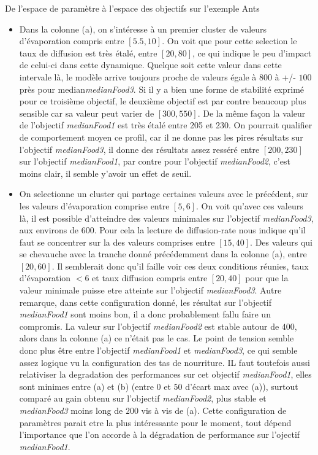 \begin{testiv}{De l'espace de paramètre à l'espace des objectifs sur l'exemple Ants }{}
\begin{itemize}[nolistsep]
	\item Dans la colonne (a), on s'intéresse à un premier cluster de valeurs d'évaporation compris entre $[5.5, 10]$. On voit que pour cette selection le taux de diffusion est très étalé, entre $[20, 80]$, ce qui indique le peu d'impact de celui-ci dans cette dynamique. Quelque soit cette valeur dans cette intervale là, le modèle arrive toujours proche de valeurs égale à $800$ à +/- $100$ près pour median\textit{medianFood3}. Si il y a bien une forme de stabilité exprimé pour ce troisième objectif, le deuxième objectif est par contre beaucoup plus sensible car sa valeur peut varier de $[300, 550]$. De la même façon la valeur de l'objectif \textit{medianFood1} est très étalé entre 205 et 230. On pourrait qualifier de comportement moyen ce profil, car il ne donne pas les pires résultats sur l'objectif \textit{medianFood3}, il donne des résultats assez resséré entre $[200, 230]$ sur l'objectif \textit{medianFood1}, par contre pour l'objectif \textit{medianFood2}, c'est moins clair, il semble y'avoir un effet de seuil.
	\item On selectionne un cluster qui partage certaines valeurs avec le précédent, sur les valeurs d'évaporation comprise entre $[5, 6]$. On voit qu'avec ces valeurs là, il est possible d'atteindre des valeurs minimales sur l'objectif \textit{medianFood3}, aux environs de $600$. Pour cela la lecture de diffusion-rate nous indique qu'il faut se concentrer sur la des valeurs comprises entre $[15, 40]$. Des valeurs qui se chevauche avec la tranche donné précédemment dans la colonne (a), entre $[20, 60]$. Il semblerait donc qu'il faille voir ces deux conditions réunies, taux d'évaporation $< 6$ et taux diffusion compris entre $[20, 40]$ pour que la valeur minimale puisse etre atteinte sur l'objectif \textit{medianFood3}. Autre remarque, dans cette configuration donné, les résultat sur l'objectif \textit{medianFood1} sont moins bon, il a donc probablement fallu faire un compromis. La valeur sur l'objectif \textit{medianFood2} est stable autour de $400$, alors dans la colonne (a) ce n'était pas le cas. Le point de tension semble donc plus être entre l'objectif \textit{medianFood1} et \textit{medianFood3}, ce qui semble assez logique vu la configuration des tas de nourriture. IL faut toutefois aussi relativiser la degradation des performances sur cet objectif \textit{medianFood1}, elles sont minimes entre (a) et (b) (entre $0$ et $50$ d'écart max avec (a)), surtout comparé au gain obtenu sur l'objectif \textit{medianFood2}, plus stable et \textit{medianFood3} moins long de $200$ vis à vis de (a). Cette configuration de paramètres parait etre la plus intéressante pour le moment, tout dépend l'importance que l'on accorde à la dégradation de performance sur l'ojectif \textit{medianFood1}.

\end{itemize}
\end{testiv}
